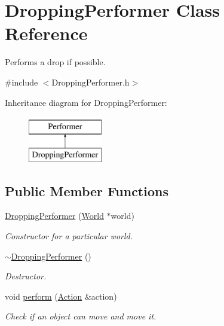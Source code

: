 \hypertarget{classDroppingPerformer}{\section{Dropping\-Performer Class Reference}
\label{classDroppingPerformer}
}


Performs a drop if possible.  




{\ttfamily \#include $<$Dropping\-Performer.\-h$>$}

Inheritance diagram for Dropping\-Performer\-:\begin{figure}[H]
\begin{center}
\leavevmode
\includegraphics[height=2.000000cm]{classDroppingPerformer}
\end{center}
\end{figure}
\subsection*{Public Member Functions}
\begin{DoxyCompactItemize}
\item 
\hyperlink{classDroppingPerformer_a5a507b3572ae68a347b67bd4e1e96cd9}{Dropping\-Performer} (\hyperlink{classWorld}{World} $\ast$world)
\begin{DoxyCompactList}\small\item\em Constructor for a particular world. \end{DoxyCompactList}\item 
\hyperlink{classDroppingPerformer_abdec9c06463e6f5a4b43fda65b52afd4}{$\sim$\-Dropping\-Performer} ()
\begin{DoxyCompactList}\small\item\em Destructor. \end{DoxyCompactList}\item 
void \hyperlink{classDroppingPerformer_a1e3c90d034e5e6a7333484668e3c5cc4}{perform} (\hyperlink{classAction}{Action} \&action)
\begin{DoxyCompactList}\small\item\em Check if an object can move and move it. \end{DoxyCompactList}\end{DoxyCompactItemize}


